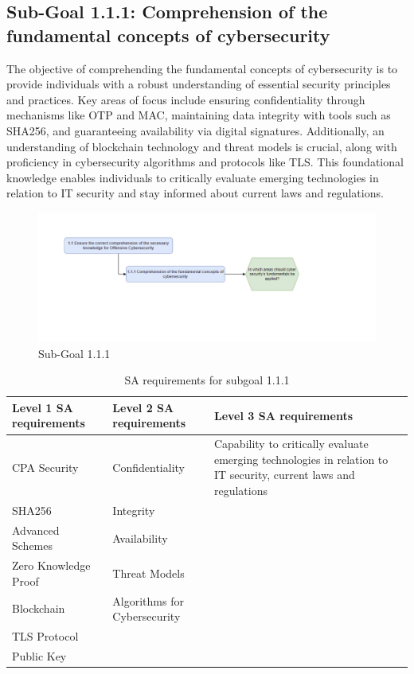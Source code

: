 \subsection{Sub-Goal 1.1.1: Comprehension of the fundamental concepts of cybersecurity }
The objective of comprehending the fundamental concepts of cybersecurity is to provide individuals with a robust understanding of essential security principles and practices. Key areas of focus include ensuring confidentiality through mechanisms like OTP and MAC, maintaining data integrity with tools such as SHA256, and guaranteeing availability via digital signatures. Additionally, an understanding of blockchain technology and threat models is crucial, along with proficiency in cybersecurity algorithms and protocols like TLS. This foundational knowledge enables individuals to critically evaluate emerging technologies in relation to IT security and stay informed about current laws and regulations.

\begin{figure}[H]
    \centering
    \includegraphics[width=\textwidth]{./assets/subgoal_1.1.1.png}
    \caption{Sub-Goal 1.1.1}
    \label{fig:subgoal_1.1.1}
\end{figure}

\begin{table}[H]
    \begin{center}
    \begin{tabular}{ | m{5cm} | m{5cm}| m{5cm} | } 
      \hline
      \textbf{Level 1 SA requirements} & \textbf{Level 2 SA requirements}  & \textbf{Level 3 SA requirements}  \\ 
      \hline
      CPA Security & Confidentiality & Capability to critically evaluate emerging technologies in relation to IT security, current laws and regulations\\ 
      \hline
      SHA256 & Integrity & \\ 
      \hline
      Advanced Schemes & Availability & \\ 
      \hline
      Zero Knowledge Proof &  Threat Models & \\ 
      \hline
      Blockchain & Algorithms for Cybersecurity  & \\ 
      \hline
      TLS Protocol &  & \\ 
      \hline
      Public Key&  & \\ 
      \hline
    \end{tabular}
    \end{center}
    \caption{SA requirements for subgoal 1.1.1}
    \end{table}
    

